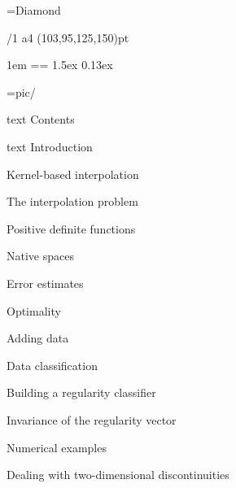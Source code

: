 \useOpTeX  %


\hyperlinks \Black \Black
{}

\enlang
\fontfam[BaskervilleMT]
\fontfam[EBGaramond]
\fontfam[TypewriterMT]
\BaskervilleMT
\typosize[12.2/14.42]

\font\symbols=Diamond %
\def\QED{\hbox{\symbols\resizethefont \,❖}}
\famvardef{}
\famvardef{}
\famvardef\tt{\TypewriterMT{}\typoscale[870/]\rm}


\margins/1 a4 (103,95,125,150)pt


\parindent 1em
\iindent=\parindent \ttindent=\parindent
\parskip 1.5ex
 0.13ex

\picdir={pic/}

\bgroup
\let\_mtext\ignoreit
\nonum\notoc\chap Contents
\egroup
\tocpage


\bgroup
\let\_mtext\ignoreit
\nonum\chap Introduction
\egroup

\chap Kernel-based interpolation

\sec The interpolation problem


\sec[positivesec] Positive definite functions


\sec Native spaces


\sec[errorsec] Error estimates


\sec Optimality


\sec[addingsec] Adding data


\chap Data classification

\sec[buildingsec] Building a regularity classifier


\sec Invariance of the regularity vector


\sec Numerical examples


\chap Dealing with two-dimensional discontinuities

